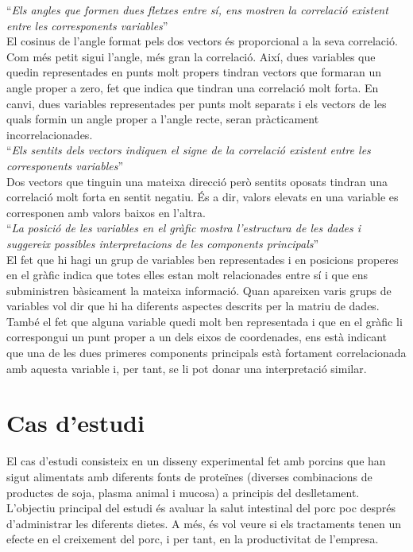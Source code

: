 \documentclass[english]{article}
\begin{document}
``\textit{Els angles que formen dues fletxes entre sí, ens mostren la correlació existent entre les corresponents variables}''
\\

El cosinus de l'angle format pels dos vectors és proporcional a la seva correlació. Com
més petit sigui l'angle, més gran la correlació. Així, dues variables que quedin
representades en punts molt propers tindran vectors que formaran un angle proper a zero, fet que indica que tindran una correlació molt forta. En canvi, dues variables representades per punts molt separats i els vectors de les quals formin un angle proper a l'angle recte, seran pràcticament incorrelacionades.
\\

``\textit{Els sentits dels vectors indiquen el signe de la correlació existent entre les
corresponents variables}''
\\

Dos vectors que tinguin una mateixa direcció però sentits oposats tindran una correlació
molt forta en sentit negatiu. És a dir, valors elevats en una variable es corresponen amb
valors baixos en l'altra.
\\

``\textit{La posició de les variables en el gràfic mostra l'estructura de les dades i suggereix possibles interpretacions de les components principals}''
\\

El fet que hi hagi un grup de variables ben representades i en posicions properes en el
gràfic indica que totes elles estan molt relacionades entre sí i que ens subministren
bàsicament la mateixa informació. Quan apareixen varis grups de variables vol dir que hi
ha diferents aspectes descrits per la matriu de dades. També el fet que alguna variable quedi molt ben representada i que en el gràfic li correspongui un punt proper a un dels eixos de coordenades, ens està indicant que una de les dues primeres components principals està fortament correlacionada amb aquesta variable i, per tant, se li pot donar una interpretació similar.


\clearpage
\section{Cas d'estudi}
El cas d'estudi consisteix en un disseny experimental fet amb porcins que han sigut alimentats amb diferents fonts de proteïnes (diverses combinacions de productes de soja, plasma animal i mucosa) a principis del deslletament. L'objectiu principal del estudi és avaluar la salut intestinal del porc poc després d'administrar les diferents dietes. A més, és vol veure si els tractaments tenen un efecte en el creixement del porc, i per tant, en la productivitat de l'empresa.
\end{document}

